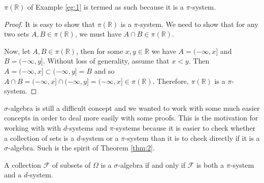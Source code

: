 \begin{notes}
$\pi(\mathbb R)$ of Example \eqref{eg:1} is termed as such because it is a $\pi$-system.
\end{notes}

\begin{proof}
It is easy to show that $\pi(\mathbb R)$ is a $\pi$-system. We need to show that for any two sets $A, B\in \pi(\mathbb R)$, we must have $A\cap B\in \pi(\mathbb R)$.

Now, let $A,B\in\pi(\mathbb R)$, then for some $x,y\in\mathbb R$ we have $A=(-\infty,x]$ and $B=(-\infty,y]$. Without loss of generality, assume that $x<y$. Then $A=(-\infty,x]\subset (-\infty,y]= B$ and so $A\cap B=(-\infty,x]\cap(-\infty,y]=(-\infty,x]\in \pi(\mathbb R)$. Therefore, $\pi(\mathbb R)$ is a $\pi$-system.
\end{proof}

$\sigma$-algebra is still a difficult concept and we wanted to work with some much easier concepts in order to deal more easily with some proofs. This is the motivation for working with with $d$-systems and $\pi$-systems because it is easier to check whether a collection of sets is a $d$-system or a $\pi$-system than it is to check directly if it is a $\sigma$-algebra. Such is the spirit of Theorem \eqref{thm:2}.

\begin{theorem}\label{thm:2}
A collection $\mathcal F$ of subsets of $\Omega$ is a $\sigma$-algebra if and only if $\mathcal F$ is 
both a $\pi$-system and a $d$-system.
\end{theorem}

